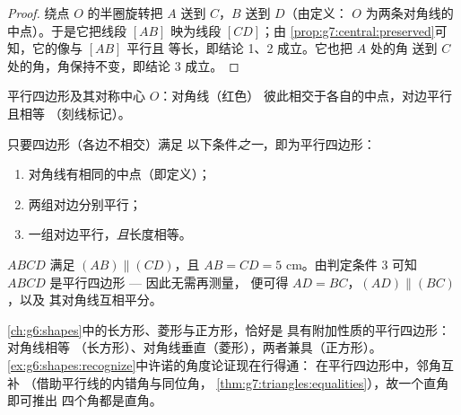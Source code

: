 \begin{proof}
绕点 $O$ 的半圈旋转把 $A$ 送到 $C$，$B$ 送到 $D$（由定义：
$O$ 为两条对角线的中点）。于是它把线段
$[AB]$ 映为线段 $[CD]$；由
\cref{prop:g7:central:preserved}可知，它的像与 $[AB]$ 平行且
等长，即结论 1、2 成立。它也把 $A$ 处的角
送到 $C$ 处的角，角保持不变，即结论 3 成立。
\end{proof}

\begin{omfigure}

{\small 平行四边形及其对称中心 $O$：对角线（红色）
彼此相交于各自的中点，对边平行且相等
（刻线标记）。}
\end{omfigure}

\begin{theorem}[判定平行四边形]\label{thm:g7:central:recognize}
只要四边形（各边不相交）满足
以下条件\emph{之一}，即为平行四边形：
\begin{enumerate}
  \item 对角线有相同的中点（即定义）；
  \item 两组对边分别平行；
  \item 一组对边平行，\emph{且}长度相等。
\end{enumerate}
\end{theorem}
\admitted

\begin{example}\label{ex:g7:central:recognize}
$ABCD$ 满足 $(AB) \parallel (CD)$，且 $AB = CD = 5$ cm。由判定条件 3
可知 $ABCD$ 是平行四边形 --- 因此无需再测量，
便可得 $AD = BC$，$(AD) \parallel (BC)$，以及
其对角线互相平分。
\end{example}

\begin{remark}[特殊的平行四边形]
\cref{ch:g6:shapes}中的长方形、菱形与正方形，恰好是
具有附加性质的平行四边形：对角线相等
（长方形）、对角线垂直（菱形），两者兼具（正方形）。
\cref{ex:g6:shapes:recognize}中许诺的角度论证现在行得通：
在平行四边形中，邻角互补
（借助平行线的内错角与同位角，
\cref{thm:g7:triangles:equalities}），故一个直角即可推出
四个角都是直角。
\end{remark}

